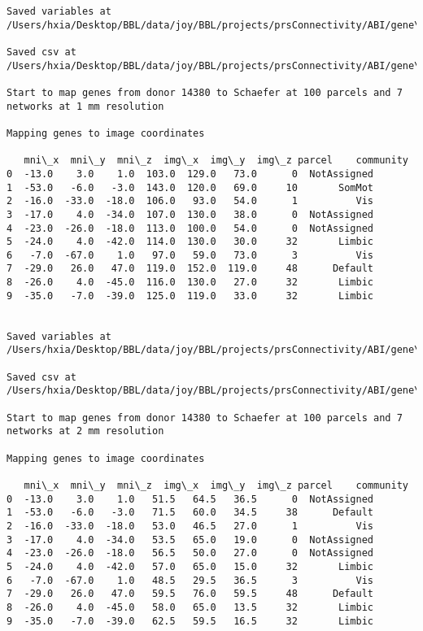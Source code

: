 \documentclass[11pt]{article}
\begin{document}
\begin{Verbatim}[commandchars=\\\{\}]
Saved variables at /Users/hxia/Desktop/BBL/data/joy/BBL/projects/prsConnectivity/ABI/gene\_mapping/12876donor\_800Parcels\_17Network\_2mm.pkl

Saved csv at /Users/hxia/Desktop/BBL/data/joy/BBL/projects/prsConnectivity/ABI/gene\_mapping/12876donor\_800Parcels\_17Network\_2mm.csv

Start to map genes from donor 14380 to Schaefer at 100 parcels and 7 networks at 1 mm resolution

Mapping genes to image coordinates

   mni\_x  mni\_y  mni\_z  img\_x  img\_y  img\_z parcel    community
0  -13.0    3.0    1.0  103.0  129.0   73.0      0  NotAssigned
1  -53.0   -6.0   -3.0  143.0  120.0   69.0     10       SomMot
2  -16.0  -33.0  -18.0  106.0   93.0   54.0      1          Vis
3  -17.0    4.0  -34.0  107.0  130.0   38.0      0  NotAssigned
4  -23.0  -26.0  -18.0  113.0  100.0   54.0      0  NotAssigned
5  -24.0    4.0  -42.0  114.0  130.0   30.0     32       Limbic
6   -7.0  -67.0    1.0   97.0   59.0   73.0      3          Vis
7  -29.0   26.0   47.0  119.0  152.0  119.0     48      Default
8  -26.0    4.0  -45.0  116.0  130.0   27.0     32       Limbic
9  -35.0   -7.0  -39.0  125.0  119.0   33.0     32       Limbic


Saved variables at /Users/hxia/Desktop/BBL/data/joy/BBL/projects/prsConnectivity/ABI/gene\_mapping/14380donor\_100Parcels\_7Network\_1mm.pkl

Saved csv at /Users/hxia/Desktop/BBL/data/joy/BBL/projects/prsConnectivity/ABI/gene\_mapping/14380donor\_100Parcels\_7Network\_1mm.csv

Start to map genes from donor 14380 to Schaefer at 100 parcels and 7 networks at 2 mm resolution

Mapping genes to image coordinates

   mni\_x  mni\_y  mni\_z  img\_x  img\_y  img\_z parcel    community
0  -13.0    3.0    1.0   51.5   64.5   36.5      0  NotAssigned
1  -53.0   -6.0   -3.0   71.5   60.0   34.5     38      Default
2  -16.0  -33.0  -18.0   53.0   46.5   27.0      1          Vis
3  -17.0    4.0  -34.0   53.5   65.0   19.0      0  NotAssigned
4  -23.0  -26.0  -18.0   56.5   50.0   27.0      0  NotAssigned
5  -24.0    4.0  -42.0   57.0   65.0   15.0     32       Limbic
6   -7.0  -67.0    1.0   48.5   29.5   36.5      3          Vis
7  -29.0   26.0   47.0   59.5   76.0   59.5     48      Default
8  -26.0    4.0  -45.0   58.0   65.0   13.5     32       Limbic
9  -35.0   -7.0  -39.0   62.5   59.5   16.5     32       Limbic



\end{Verbatim}
\end{document}
